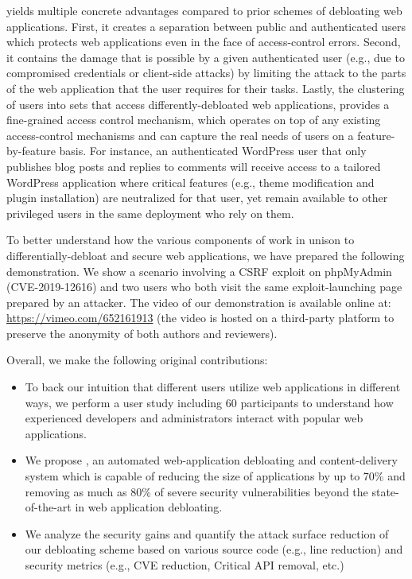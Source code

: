 
\sys{} yields multiple concrete advantages compared to prior schemes of debloating web applications. First, it creates a separation between public and authenticated users which protects web applications even in the face of access-control errors. 
Second, it contains the damage that is possible by a given authenticated user (e.g., due to compromised credentials or client-side attacks) by limiting the attack to the parts of the web application that the user requires for their tasks. 
Lastly, the clustering of users into sets that access differently-debloated web applications, provides a fine-grained access control mechanism, which operates on top of any existing access-control mechanisms and can capture the real needs of users on a feature-by-feature basis. 
For instance, an authenticated WordPress user that only publishes blog posts and replies to comments will receive access to a tailored WordPress application where critical features (e.g., theme modification and plugin installation) are neutralized for that user, yet remain available to other privileged users in the same deployment who rely on them. 

To better understand how the various components of \sys{} work in unison to differentially-debloat and secure web applications, we have prepared the following demonstration. We show a scenario involving a CSRF exploit on phpMyAdmin (CVE-2019-12616) and two users who both visit the same exploit-launching page prepared by an attacker. The video of our demonstration is available online at: \url{https://vimeo.com/652161913} (the video is hosted on a third-party platform to preserve the anonymity of both authors and reviewers).

\noindent Overall, we make the following original contributions:


\begin{itemize}
    \item To back our intuition that different users utilize web applications in different ways, we perform a user study including 60 participants to understand how experienced developers and administrators interact with popular web applications.
    \item We propose \sys{}, an automated web-application debloating and content-delivery system which is capable of reducing the size of applications by up to 70\% and removing as much as 80\% of severe security vulnerabilities beyond the state-of-the-art in web application debloating.
    \item We analyze the security gains and quantify the attack surface reduction of our debloating scheme based on various source code (e.g., line reduction) and security metrics (e.g., CVE reduction, Critical API removal, etc.)
\end{itemize}

